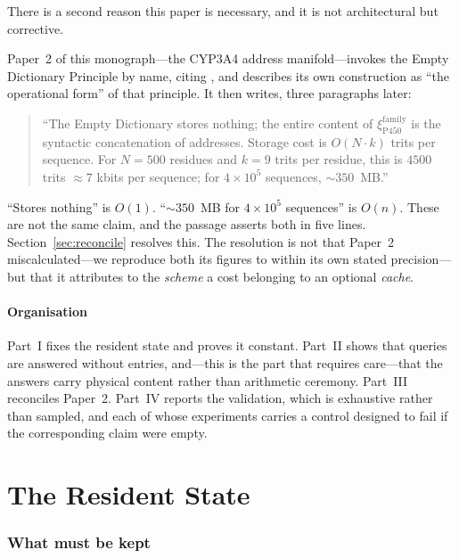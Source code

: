 \documentclass[11pt,twocolumn,a4paper]{article}
\newcommand{\Sexp}{\xi}
\theoremstyle{plain}
\theoremstyle{definition}
\theoremstyle{remark}
\begin{document}
There is a second reason this paper is necessary, and it is not
architectural but corrective.

Paper~2 of this monograph---the CYP3A4 address manifold---invokes the Empty
Dictionary Principle by name, citing \citet{sachikonye2025c}, and describes
its own construction as ``the operational form'' of that principle. It then
writes, three paragraphs later:

\begin{quote}
\small
``The Empty Dictionary stores nothing; the entire content of
$\Sexp_{\mathrm{P450}}^{\mathrm{family}}$ is the syntactic concatenation of
addresses. Storage cost is $O(N \cdot k)$ trits per sequence. For $N = 500$
residues and $k = 9$ trits per residue, this is $4500$ trits ${\approx}7$
kbits per sequence; for $4 \times 10^{5}$ sequences, ${\sim}350$~MB.''
\end{quote}

``Stores nothing'' is $O(1)$. ``${\sim}350$~MB for $4 \times 10^{5}$
sequences'' is $O(n)$. These are not the same claim, and the passage asserts
both in five lines. Section~\ref{sec:reconcile} resolves this. The
resolution is not that Paper~2 miscalculated---we reproduce both its figures
to within its own stated precision---but that it attributes to the
\emph{scheme} a cost belonging to an optional \emph{cache}.

\subsection{Organisation}

Part~I fixes the resident state and proves it constant. Part~II shows that
queries are answered without entries, and---this is the part that requires
care---that the answers carry physical content rather than arithmetic
ceremony. Part~III reconciles Paper~2. Part~IV reports the validation, which
is exhaustive rather than sampled, and each of whose experiments carries a
control designed to fail if the corresponding claim were empty.

\part{The Resident State}
\section{What must be kept}
\label{sec:resident}
\end{document}
